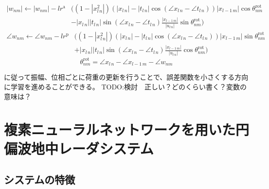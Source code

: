 \documentclass[11pt,a4paper,uplatex,draft]{ujarticle}
\begin{document}
    \begin{equation}
      \label{eq:update_a}
      \begin{split}
        |w_{nm}| \leftarrow |w_{nm}| - lr^\mathrm{a} & \biggl( (1-|x_{l\,n}^2|)(|x_{l\, n}| - |t_{l\, n}| \cos (\angle x_{l\, n} - \angle t_{l\, n}))|x_{l-1\, m}| \cos \theta^{\mathrm{rot}}_{nm}  \\
                        & - |x_{l\, n}| |t_{l\, n}| \sin (\angle x_{l\, n} - \angle t_{l\, n}) \frac{|x_{l-1\, m}|}{|u_{l\, n}|} \sin \theta^{\mathrm{rot}}_{nm} \biggr)
      \end{split}
    \end{equation}
    \begin{equation}
      \label{eq:update_p}
      \begin{split}
        \angle w_{nm} \leftarrow \angle w_{nm} - lr^\mathrm{p} & \bigg( (1-|x_{l\,n}^2|)(|x_{l\, n}| - |t_{l\, n}| \cos (\angle x_{l\, n} - \angle t_{l\, n}))|x_{l-1\, m}| \sin \theta^{\mathrm{rot}}_{nm} \\
                        &  + |x_{l\, n}| |t_{l\, n}| \sin (\angle x_{l\, n} - \angle t_{l\, n}) \frac{|x_{l-1\, m}|}{|u_{l\, n}|} \cos \theta^{\mathrm{rot}}_{nm} \bigg)
      \end{split}
    \end{equation}
    \begin{equation}
      \label{eq:rot}
        \theta^{\mathrm{rot}}_{nm} = \angle x_{l\, n} - \angle x_{l-1\, m} -\angle w_{nm}
    \end{equation}

    に従って振幅、位相ごとに荷重の更新を行うことで、誤差関数を小さくする方向に学習を進めることができる。\cite{CVNN}
    TODO:検討　正しい？どのくらい書く？変数の意味は？



\section{複素ニューラルネットワークを用いた円偏波地中レーダシステム}

  
  \subsection{システムの特徴}
    
\end{document}
